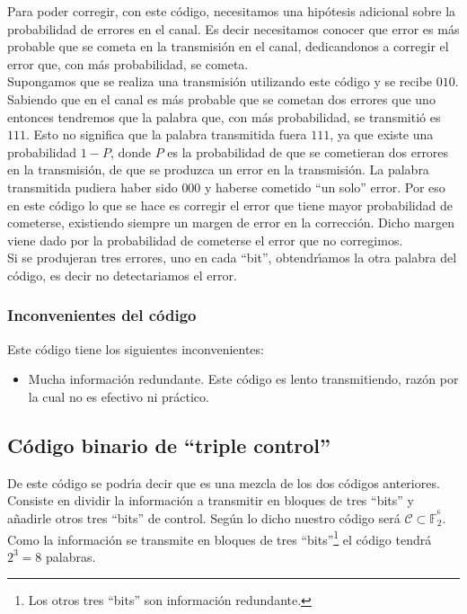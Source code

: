 Para poder corregir, con este c\'odigo, necesitamos una hip\'otesis adicional
sobre la probabilidad de errores en el canal. Es decir necesitamos conocer que
error es m\'as probable que se cometa en la transmisi\'on en el canal,
dedicandonos a corregir el error que, con m\'as probabilidad, se cometa.\\

Supongamos que se realiza una transmisi\'on utilizando este c\'odigo y se
recibe $010$. Sabiendo que en el canal es m\'as probable que se cometan dos
errores que uno entonces tendremos que la palabra que, con m\'as probabilidad,
se transmiti\'o es $111$. Esto no significa que la palabra transmitida fuera
$111$, ya que existe una probabilidad $1-P$, donde $P$ es la probabilidad de
que se cometieran dos errores en la transmisi\'on, de que se produzca un error
en la transmisi\'on. La palabra transmitida pudiera haber sido $000$ y haberse
cometido ``un solo'' error. Por eso en este c\'odigo lo que se hace es corregir
el error que tiene mayor probabilidad de cometerse, existiendo siempre un margen
de error en la correcci\'on. Dicho margen viene dado por la probabilidad de 
cometerse el error que no corregimos.\\

Si se produjeran tres errores, uno en cada ``bit'', obtendr\'{\i}amos la
otra palabra del c\'odigo, es decir no detectariamos el error.

\subsubsection{Inconvenientes del c\'odigo}

Este c\'odigo tiene los siguientes inconvenientes:
\begin{itemize}
\item Mucha informaci\'on redundante. Este c\'odigo es lento transmitiendo,
raz\'on por la cual no es efectivo ni pr\'actico.
\end{itemize}
%
\newpage
%
\subsection{C\'odigo binario de ``triple control''}

De este c\'odigo se podr\'{\i}a decir que es una mezcla de los dos c\'odigos
anteriores. Consiste en dividir la informaci\'on a transmitir en bloques de
tres ``bits'' y a\~nadirle otros tres ``bits'' de control. Seg\'un lo dicho
nuestro c\'odigo ser\'a $\mathcal{C}\subset \mathbb{F}^{^6}_2$. Como la
informaci\'on se transmite en bloques de tres ``bits''\footnote{Los otros tres
``bits'' son informaci\'on redundante.} el c\'odigo tendr\'a $2^3=8$ palabras.\\


